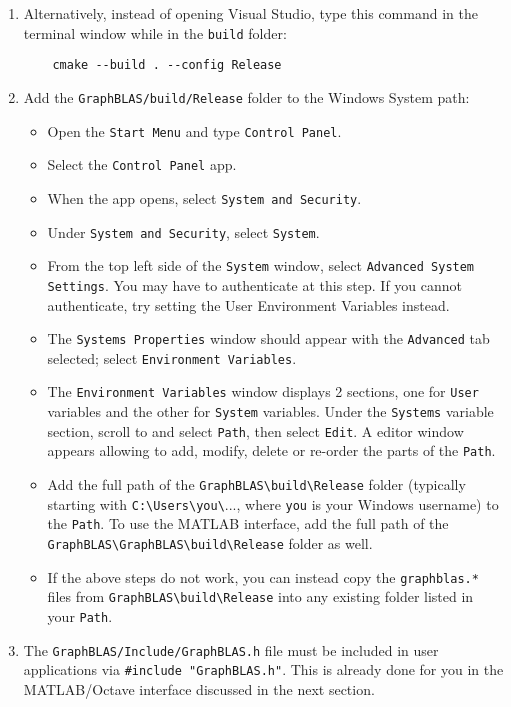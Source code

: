 \documentclass[12pt]{article}
\begin{document}
\begin{enumerate}
\item Alternatively, instead of opening Visual Studio,
    type this command in the terminal window while in the \verb'build' folder:
    {\small
    \begin{verbatim}
    cmake --build . --config Release
    \end{verbatim}}

\item Add the \verb'GraphBLAS/build/Release' folder to the Windows System path:

    \begin{itemize}
    \item Open the \verb'Start Menu' and type \verb'Control Panel'.
    \item Select the \verb'Control Panel' app.
    \item When the app opens, select \verb'System and Security'.
    \item Under \verb'System and Security', select \verb'System'.
    \item From the top left side of the \verb'System' window, select
        \verb'Advanced System Settings'.  You may have to authenticate
        at this step.
        If you cannot authenticate, try setting the User Environment Variables
        instead.
    \item The \verb'Systems Properties' window should appear with the
        \verb'Advanced' tab selected;
        select \verb'Environment Variables'.
    \item The \verb'Environment Variables' window displays 2 sections, one for
        \verb'User' variables and the other for \verb'System' variables.  Under
        the \verb'Systems' variable section, scroll to and select \verb'Path',
        then select \verb'Edit'.   A editor window appears allowing to add,
        modify, delete or re-order the parts of the \verb'Path'.
    \item Add the full path of the \verb'GraphBLAS\build\Release' folder
        (typically starting with \verb'C:\Users\you\'..., where \verb'you' is
        your Windows username) to the \verb'Path'.
        To use the MATLAB interface, add
        the full path of the \verb'GraphBLAS\GraphBLAS\build\Release' folder
        as well.
    \item If the above steps do not work, you can instead copy the
        \verb'graphblas.*' files from \verb'GraphBLAS\build\Release' into any
        existing folder listed in your \verb'Path'.
    \end{itemize}

\item The \verb'GraphBLAS/Include/GraphBLAS.h' file must be included in user
    applications via \verb'#include "GraphBLAS.h"'.  This is already done for
    you in the MATLAB/Octave interface discussed in the next section.

\end{enumerate}
\end{document}
